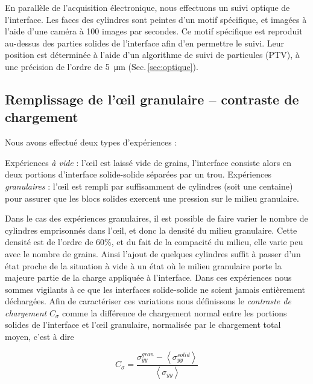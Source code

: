En parallèle de l'acquisition électronique, nous effectuons un suivi optique de l'interface. Les faces des cylindres sont peintes d'un motif spécifique, et imagées à l'aide d'une caméra à 100 images par secondes. Ce motif spécifique est reproduit au-dessus des parties solides de l'interface afin d'en permettre le suivi. Leur position est déterminée à l'aide d'un algorithme de suivi de particules (PTV), à une précision de l'ordre de \SI{5}{\micro\meter} (Sec.\,\ref{sec:optique}).



\subsection{Remplissage de l'œil granulaire -- contraste de chargement}

Nous avons effectué deux types d'expériences :

\begin{itemize}
\bitem Expériences \textit{à vide} : l'œil est laissé vide de grains, l'interface consiste alors en deux portions d'interface solide-solide séparées par un trou.
\bitem Expériences \textit{granulaires} : l'œil est rempli par suffisamment de cylindres (soit une centaine) pour assurer que les blocs solides exercent une pression sur le milieu granulaire.
\end{itemize}

Dans le cas des expériences granulaires, il est possible de faire varier le nombre de cylindres emprisonnés dans l'œil, et donc la densité du milieu granulaire. Cette densité est de l'ordre de 60\%, et du fait de la compacité du milieu, elle varie peu avec le nombre de grains. Ainsi l'ajout de quelques cylindres suffit à passer d'un état proche de la situation à vide à un état où le milieu granulaire porte la majeure partie de la charge appliquée à l'interface.
Dans ces expériences nous sommes vigilants à ce que les interfaces solide-solide ne soient jamais entièrement déchargées.
Afin de caractériser ces variations nous définissons le \textit{contraste de chargement} $C_\sigma$ comme la différence de chargement normal entre les portions solides de l'interface et l'œil granulaire, normalisée par le chargement total moyen, c'est à dire

\begin{equation}
C_\sigma=\dfrac{\sigma_{yy}^{gran}-\left\langle \sigma_{yy}^{solid} \right\rangle}{\left\langle\sigma_{yy}\right\rangle}
\end{equation}


